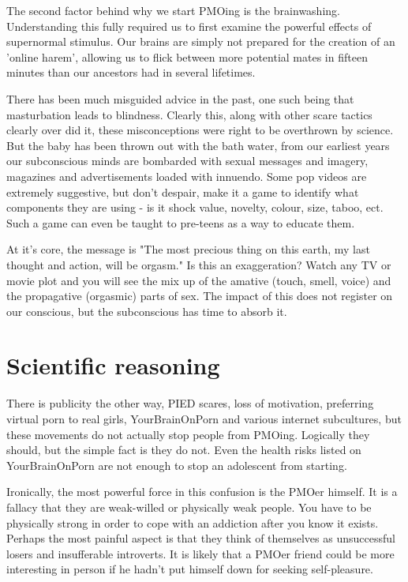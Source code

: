 \documentclass[easypeasy.tex]{subfiles}
\begin{document}
The second factor behind why we start PMOing is the brainwashing. Understanding this fully required us to first examine the powerful effects of supernormal stimulus. Our brains are simply not prepared for the creation of an 'online harem', allowing us to flick between more potential mates in fifteen minutes than our ancestors had in several lifetimes.

There has been much misguided advice in the past, one such being that masturbation leads to blindness. Clearly this, along with other scare tactics clearly over did it, these misconceptions were right to be overthrown by science. But the baby has been thrown out with the bath water, from our earliest years our subconscious minds are bombarded with sexual messages and imagery, magazines and advertisements loaded with innuendo. Some pop videos are extremely suggestive, but don't despair, make it a game to identify what components they are using - is it shock value, novelty, colour, size, taboo, ect. Such a game can even be taught to pre-teens as a way to educate them.

At it's core, the message is "The most precious thing on this earth, my last thought and action, will be orgasm." Is this an exaggeration? Watch any TV or movie plot and you will see the mix up of the amative (touch, smell, voice) and the propagative (orgasmic) parts of sex. The impact of this does not register on our conscious, but the subconscious has time to absorb it.

\section{Scientific reasoning}
There is publicity the other way, PIED scares, loss of motivation, preferring virtual porn to real girls, YourBrainOnPorn and various internet subcultures, but these movements do not actually stop people from PMOing. Logically they should, but the simple fact is they do not. Even the health risks listed on YourBrainOnPorn are not enough to stop an adolescent from starting.

Ironically, the most powerful force in this confusion is the PMOer himself. It is a fallacy that they are weak-willed or physically weak people. You have to be physically strong in order to cope with an addiction after you know it exists. Perhaps the most painful aspect is that they think of themselves as unsuccessful losers and insufferable introverts. It is likely that a PMOer friend could be more interesting in person if he hadn't put himself down for seeking self-pleasure.
\end{document}
